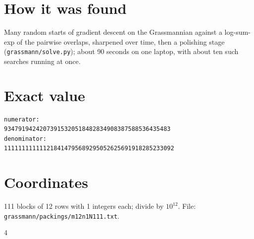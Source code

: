 \documentclass[11pt,a4paper]{article}
\begin{document}
\section{How it was found}
Many random starts of gradient descent on the Grassmannian against a log-sum-exp of the pairwise overlaps, sharpened over time, then a polishing stage (\texttt{grassmann/solve.py}); about 90 seconds on one laptop, with about ten such searches running at once.


\appendix
\section{Exact value}
{\small
\begin{verbatim}
numerator:
93479194242073915320518482834908387588536435483
denominator:
111111111111218414795689295052625691918285233092
\end{verbatim}}

\section{Coordinates}
111 blocks of 12 rows with 1 integers each; divide by $10^{12}$. File: \texttt{grassmann/packings/m12n1N111.txt}.
{\tiny
\begin{multicols}{4}
\end{multicols}}
\end{document}
